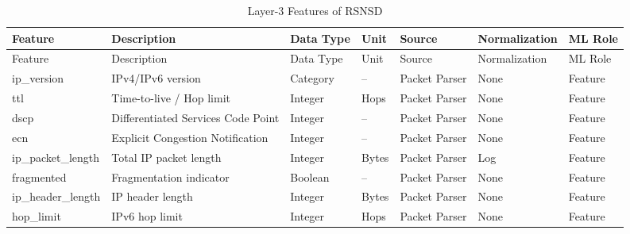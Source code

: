 \documentclass[12pt,a4paper]{article}
\begin{document}
\begin{longtable}{p{3cm}p{5cm}p{2cm}p{1.5cm}p{2.3cm}p{2cm}p{2cm}}
	\caption{Layer-3 Features of RSNSD}
	\label{tab:l3_features}\\
	
	\toprule
	Feature & Description & Data Type & Unit & Source & Normalization & ML Role\\
	\midrule
	\endfirsthead
	
	\toprule
	Feature & Description & Data Type & Unit & Source & Normalization & ML Role\\
	\midrule
	\endhead
	
	ip\_version & IPv4/IPv6 version & Category & -- & Packet Parser & None & Feature\\
	ttl & Time-to-live / Hop limit & Integer & Hops & Packet Parser & None & Feature\\
	dscp & Differentiated Services Code Point & Integer & -- & Packet Parser & None & Feature\\
	ecn & Explicit Congestion Notification & Integer & -- & Packet Parser & None & Feature\\
	ip\_packet\_length & Total IP packet length & Integer & Bytes & Packet Parser & Log & Feature\\
	fragmented & Fragmentation indicator & Boolean & -- & Packet Parser & None & Feature\\
	ip\_header\_length & IP header length & Integer & Bytes & Packet Parser & None & Feature\\
	hop\_limit & IPv6 hop limit & Integer & Hops & Packet Parser & None & Feature\\
	
	\bottomrule
\end{longtable}
\end{document}
